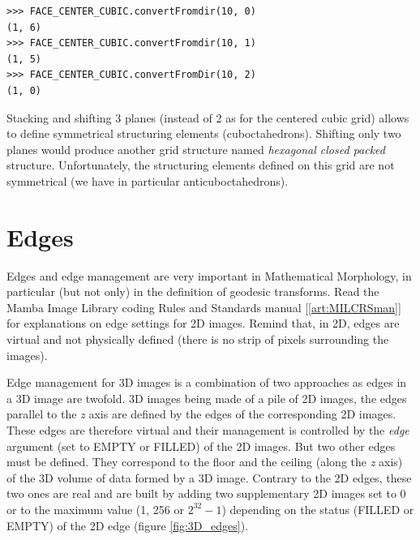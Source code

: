 \documentclass[a4paper,10pt,oneside]{article}
\begin{document}
\lstset{language=Python}
\begin{lstlisting}
>>> FACE_CENTER_CUBIC.convertFromdir(10, 0)
(1, 6)
>>> FACE_CENTER_CUBIC.convertFromdir(10, 1)
(1, 5)
>>> FACE_CENTER_CUBIC.convertFromDir(10, 2)
(1, 0)
\end{lstlisting}

Stacking and shifting 3 planes (instead of 2 as for the centered cubic grid) allows to define symmetrical structuring elements (cuboctahedrons).
Shifting only two planes would produce another grid structure named \textit{hexagonal closed packed} structure. Unfortunately, the structuring
elements defined on this grid are not symmetrical (we have in particular anticuboctahedrons).

\section{Edges}
Edges and edge management are very important in Mathematical Morphology, in particular (but not only) in  the definition of geodesic transforms.
Read the Mamba Image Library coding Rules and Standards manual [\ref{art:MILCRSman}] for explanations on edge settings for 2D images. Remind that,
in 2D, edges are virtual and not physically defined (there is no strip of pixels surrounding the images).

Edge management for 3D images is a combination of two approaches as edges in a 3D image are twofold. 3D images being made of a pile of 2D
images, the edges parallel to the \emph{z} axis are defined by the edges of the corresponding 2D images. These edges are therefore virtual and their management
is controlled by the \textit{edge} argument (set to EMPTY or FILLED) of the 2D images. But two other edges must be defined. They correspond
to the floor and the ceiling (along the \emph{z} axis) of the 3D volume of data formed by a 3D image. Contrary to the 2D edges, these two ones are
real and are built by adding two supplementary 2D images set to 0 or to the maximum value (1, 256 or $2^{32} - 1$) depending on the status (FILLED or EMPTY)
of the 2D edge (figure \ref{fig:3D_edges}).
\end{document}
